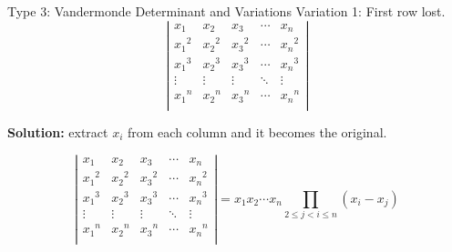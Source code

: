 \documentclass{beamer}
\begin{document}
\begin{frame}{Type 3: Vandermonde Determinant and Variations}
Variation 1: First row lost.
\begin{equation*}
    \left| \begin{matrix}
        x_1&		x_2&		x_3&		\cdots&		x_n\\
        {x_1}^2&		{x_2}^2&		{x_3}^2&		\cdots&		{x_n}^2\\
        {x_1}^3&		{x_2}^3&		{x_3}^3&		\cdots&		{x_n}^3\\
        \vdots&		\vdots&		\vdots&		\ddots&		\vdots\\
        {x_1}^n&		{x_2}^n&		{x_3}^n&		\cdots&		{x_n}^n\\
    \end{matrix} \right|
\end{equation*}

\textbf{Solution:} extract $x_i$ from each column and it becomes the original.

\begin{equation*}
    \left| \begin{matrix}
        x_1&		x_2&		x_3&		\cdots&		x_n\\
        {x_1}^2&		{x_2}^2&		{x_3}^2&		\cdots&		{x_n}^2\\
        {x_1}^3&		{x_2}^3&		{x_3}^3&		\cdots&		{x_n}^3\\
        \vdots&		\vdots&		\vdots&		\ddots&		\vdots\\
        {x_1}^n&		{x_2}^n&		{x_3}^n&		\cdots&		{x_n}^n\\
    \end{matrix} \right|=x_1x_2\cdots x_n\prod_{2\leqslant j<i\leqslant n}{\left( x_i-x_j \right)}
\end{equation*}
\end{frame}
\end{document}

